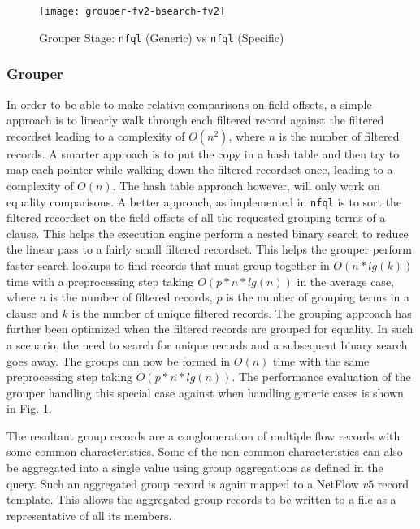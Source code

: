 \begin{figure}[ht!] \begin{center}
    \texttt{[image: grouper-fv2-bsearch-fv2]}
    \caption{Grouper Stage: \texttt{nfql} (Generic) vs \texttt{nfql}
  (Specific)} \label{fig:fv1-fv2-grouper} \end{center} \end{figure}

\subsubsection{Grouper}

In order to be able to make relative comparisons on field offsets, a simple
approach is to linearly walk through each filtered record against the filtered
recordset leading to a complexity of $O(n^2)$, where $n$ is the number of
filtered records. A smarter approach is to put the copy in a hash table and
then try to map each pointer while walking down the filtered recordset once,
leading to a complexity of $O(n)$. The hash table approach however, will only
work on equality comparisons. A better approach, as implemented in
\texttt{nfql} is to sort the filtered recordset on the field offsets of all
the requested grouping terms of a clause. This helps the execution engine
perform a nested binary search to reduce the linear pass to a fairly small
filtered recordset.  This helps the grouper perform faster search lookups to
find records that must group together in $O(n*lg(k))$ time with a
preprocessing step taking $O(p*n*lg(n))$ in the average case, where $n$ is the
number of filtered records, $p$ is the number of grouping terms in a clause
and $k$ is the number of unique filtered records. The grouping approach has
further been optimized when the filtered records are grouped for equality. In
such a scenario, the need to search for unique records and a  subsequent
binary search goes away.  The groups can now be formed in $O(n)$ time with the
same preprocessing step taking $O(p*n*lg(n))$.  The performance evaluation of
the grouper handling this special case against when handling generic cases is
shown in Fig.  \ref{fig:fv1-fv2-grouper}.

The resultant group records are a conglomeration of multiple flow records with
some common characteristics. Some of the non-common characteristics can also
be aggregated into a single value using group aggregations as defined in the
query. Such an aggregated group record is again mapped to a NetFlow $v5$
record template. This allows the aggregated group records to be written to a
file as a representative of all its members.


